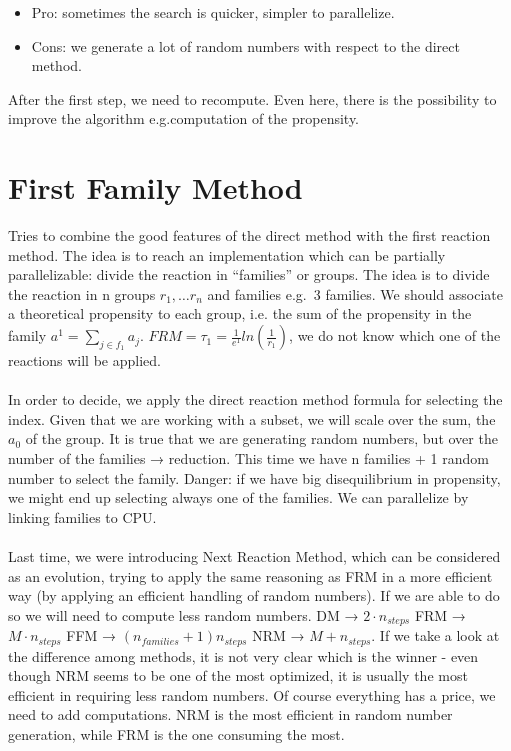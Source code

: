 \begin{itemize}
\item Pro: sometimes the search is quicker, simpler to parallelize.
\item Cons: we generate a lot of random numbers with respect to the direct method.
\end{itemize}

After the first step, we need to recompute. Even here, there is the possibility to improve the algorithm e.g.computation of the propensity.

\section{First Family Method}
Tries to combine the good features of the direct method with the first reaction method.
The idea is to reach an implementation which can be partially parallelizable: divide the reaction in ``families'' or groups.
The idea is to divide the reaction in n groups $r_1,…r_n$ and families e.g.~3 families.
We should associate a theoretical propensity to each group, i.e. the sum of the propensity in the family $a^1=\sum_{j\in f_1}a_j$.
$FRM= \tau_1= \frac{1}{e^1}ln(\frac{1}{r_1})$, we do not know which one of the reactions will be applied.
\\
\\
\noindent
In order to decide, we apply the direct reaction method formula for selecting the index.
Given that we are working with a subset, we will scale over the sum, the $a_0$ of the group.
It is true that we are generating random numbers, but over the number of the families → reduction.
This time we have n families + 1 random number to select the family.
Danger: if we have big disequilibrium in propensity, we might end up selecting always one of the families.
We can parallelize by linking families to CPU.
\\
\\
\noindent
Last time, we were introducing Next Reaction Method, which can be considered as an evolution, trying to apply the same reasoning as FRM in a more efficient way (by applying an efficient handling of random numbers).
If we are able to do so we will need to compute less random numbers.
DM → $2 \cdot n_{steps}$ FRM → $M \cdot n_{steps}$ FFM → $(n_{families}+ 1)n_{steps}$ NRM → $M+n_{steps}$.
If we take a look at the difference among methods, it is not very clear which is the winner - even though NRM seems to be one of the most optimized, it is usually the most efficient in requiring less random numbers.
Of course everything has a price, we need to add computations.
NRM is the most efficient in random number generation, while FRM is the one consuming the most.

